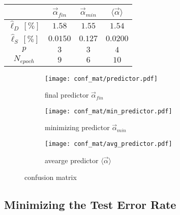 \begin{center}
\begin{tabular}{c||c|c|c}
& $\vec{\alpha}_{fin}$ & $\vec{\alpha}_{min}$ & $\langle \vec{\alpha} \rangle$\\
\hline
\hline
$\hat{\ell}_D\,[\%]$ & \boldmath$1.58$ & \boldmath$1.55$ & \boldmath$1.54$\\
$\hat{\ell}_S\,[\%]$ & $0.0150$ & $0.127$ & $0.0200$ \\
$p$ & $3$ & $3$ & $4$\\
$N_{epoch}$ & $9$ & $6$ & $10$
\end{tabular}
\end{center}

\begin{figure}
\centering
	\begin{subfigure}[t]{0.49\textwidth}
	\centering
		\texttt{[image: conf\_mat/predictor.pdf]} 
		\caption{final predictor $\vec{\alpha}_{fin}$}
	\end{subfigure}
	\hfill
	\begin{subfigure}[t]{0.49\textwidth}
	\centering
		\texttt{[image: conf\_mat/min\_predictor.pdf]} 
		\caption{minimizing predictor $\vec{\alpha}_{min}$}
	\end{subfigure}
		\begin{subfigure}[t]{0.49\textwidth}
	\centering
		\texttt{[image: conf\_mat/avg\_predictor.pdf]} 
		\caption{avearge predictor $\langle\vec{\alpha}\rangle$}
	\end{subfigure}
	\caption{confusion matrix}\label{fig:conf_mat}
\end{figure}

\subsection{Minimizing the Test Error Rate}\label{subsec:best_pred}
